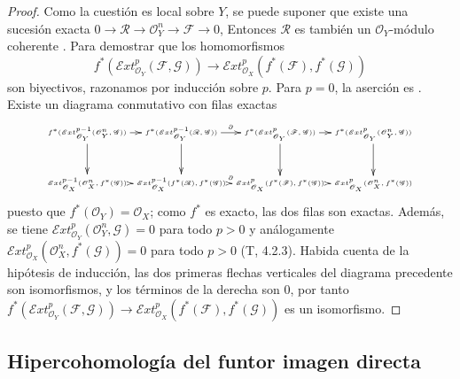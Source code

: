 \begin{proof}
Como la cuestión es local sobre $Y$, se puede suponer que existe una
sucesión exacta
$0\longrightarrow\mathcal R\longrightarrow\mathcal O_Y^n\longrightarrow\mathcal F\longrightarrow0$,
Entonces $\mathcal R$ es también un $\mathcal O_Y$-módulo coherente
.
Para demostrar que los homomorfismos
\[
f^*(\mathcal{E}xt_{\mathcal O_Y}^p(\mathcal F,\mathcal G))
\longrightarrow
\mathcal{E}xt_{\mathcal O_X}^p(f^*(\mathcal F),f^*(\mathcal G))
\]
son biyectivos, razonamos por inducción sobre $p$.
Para $p=0$, la aserción es
.
Existe un diagrama conmutativo con filas exactas
\[
\hbox{\tiny$
\xymatrix@C=2pt@R=24pt{
f^*(\mathcal{E}xt_{\mathcal O_Y}^{p-1}(\mathcal O_Y^n,\mathcal G))
\ar[r]\ar[d]&
f^*(\mathcal{E}xt_{\mathcal O_Y}^{p-1}(\mathcal R,\mathcal G))
\ar[r]^\partial\ar[d]&
f^*(\mathcal{E}xt_{\mathcal O_Y}^{p}(\mathcal F,\mathcal G))
\ar[r]\ar[d]&
f^*(\mathcal{E}xt_{\mathcal O_Y}^{p}(\mathcal O_Y^n,\mathcal G))
\ar[d]\\
\mathcal{E}xt_{\mathcal O_X}^{p-1}(\mathcal O_X^n,f^*(\mathcal G))
\ar[r]&
\mathcal{E}xt_{\mathcal O_X}^{p-1}(f^*(\mathcal R),f^*(\mathcal G))
\ar[r]^\partial&
\mathcal{E}xt_{\mathcal O_X}^{p}(f^*(\mathcal F),f^*(\mathcal G))
\ar[r]&
\mathcal{E}xt_{\mathcal O_X}^{p}(\mathcal O_X^n,f^*(\mathcal G))
}
$}
\] puesto que $f^*(\mathcal O_Y)=\mathcal O_X$; como $f^*$ es exacto, las dos filas son exactas. Además, se tiene $\mathcal{E}xt_{\mathcal O_Y}^p(\mathcal O_Y^n,\mathcal G)=0$ para todo $p>0$ y análogamente $\mathcal{E}xt_{\mathcal O_X}^p(\mathcal O_X^n,f^*(\mathcal G))=0$ para todo $p>0$ (T, 4.2.3). Habida cuenta de la hipótesis de inducción, las dos primeras flechas verticales del diagrama precedente son isomorfismos, y los términos de la derecha son 0, por tanto
$f^*(\mathcal{E}xt_{\mathcal O_Y}^p(\mathcal F,\mathcal G))\longrightarrow\mathcal{E}xt_{\mathcal O_X}^p(f^*(\mathcal F),f^*(\mathcal G))$
es un isomorfismo.
\end{proof}

\subsection{Hipercohomología del funtor imagen directa}
\label{subsection:0.12.4}
\label{subsection:0.12.4-fr}

